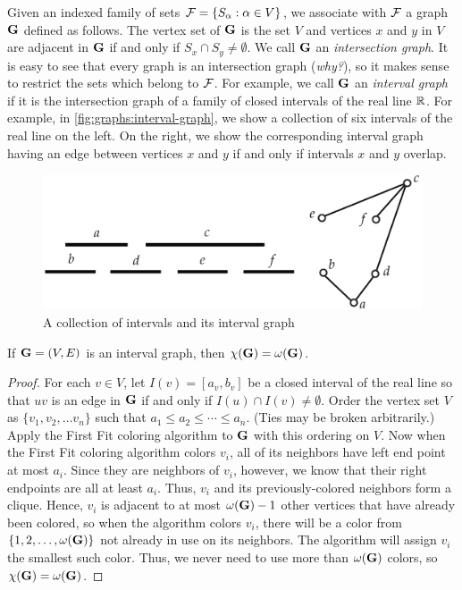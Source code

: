 Given an indexed family of sets $\mathcal{F}=\{S_\alpha:\alpha\in V\}$, we
associate with $\mathcal{F}$ a graph $\mathbf{G}$ defined as follows.  The vertex
set of $\mathbf{G}$ is the set $V$ and vertices $x$ and $y$ in $V$ are
adjacent in $\mathbf{G}$ if and only if $S_x\cap S_y \neq\emptyset$.  We
call $\mathbf{G}$ an \textit{intersection graph}.  It is easy to see that
every graph is an intersection graph (\emph{why?}), so it makes sense
to restrict the sets which belong to $\mathcal{F}$.  For example, we call
$\mathbf{G}$ an \textit{interval graph} if it is the intersection graph of a
family of closed intervals of the real line $\mathbb{R}$. For example, in
\autoref{fig:graphs:interval-graph}, we show a collection of six
intervals of the real line on the left. On the right, we show the
corresponding interval graph having an edge between vertices $x$ and
$y$ if and only if intervals $x$ and $y$ overlap.

\begin{figure}
  \centering
  \includegraphics[scale=0.5]{graphs-figs/interval-graph}
  \caption{A collection of intervals and its interval graph}
  \label{fig:graphs:interval-graph}
\end{figure}

\begin{theorem}
  \label{thm:intgraphcol}If $\mathbf{G}=(V,E)$ is an interval graph, then
  $\chi(\mathbf{G})=\omega(\mathbf{G})$.
\end{theorem}

\begin{proof}
  For each $v\in V$, let $I(v)=[a_v,b_v]$ be a closed interval of the
  real line so that $uv$ is an edge in $\mathbf{G}$ if and only if $I(u)\cap
  I(v)\neq\emptyset$. Order the vertex set $V$ as $\{v_1,v_2,\dots
  v_n\}$ such that $a_1\leq a_2\leq \cdots \leq a_n$. (Ties may be
  broken arbitrarily.) Apply the First Fit coloring algorithm to
  $\mathbf{G}$ with this ordering on $V$. Now when the First Fit coloring
  algorithm colors $v_i$, all of its neighbors have left end point at
  most $a_i$. Since they are neighbors of $v_i$, however, we know that
  their right endpoints are all at least $a_i$. Thus, $v_i$ and its
  previously-colored neighbors form a clique. Hence, $v_i$ is adjacent
  to at most $\omega(\mathbf{G})-1$ other vertices that have already been
  colored, so when the algorithm colors $v_i$, there will be a color
  from $\{1,2,\dots,\omega(\mathbf{G})\}$ not already in use on its
  neighbors.  The algorithm will assign $v_i$ the smallest such
  color. Thus, we never need to use more than $\omega(\mathbf{G})$ colors,
  so $\chi(\mathbf{G})=\omega(\mathbf{G})$.
\end{proof}


